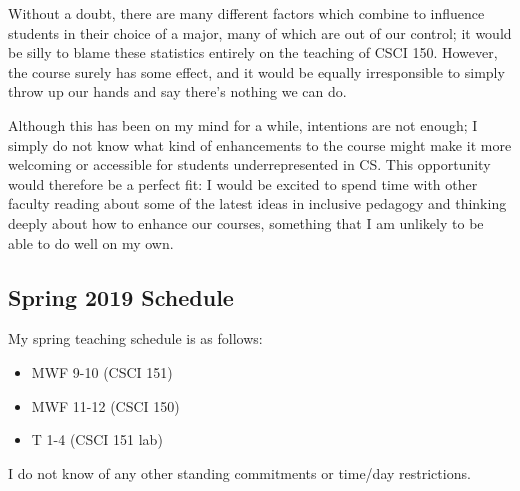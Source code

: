 \documentclass{article}
\begin{document}
Without a doubt, there are many different factors which combine to
influence students in their choice of a major, many of which are out
of our control; it would be silly to blame these statistics entirely
on the teaching of CSCI 150.  However, the course surely has some
effect, and it would be equally irresponsible to simply throw up our
hands and say there's nothing we can do.

Although this has been on my mind for a while, intentions are not
enough; I simply do not know what kind of enhancements to the course
might make it more welcoming or accessible for students
underrepresented in CS.  This opportunity would therefore be a perfect
fit: I would be excited to spend time with other faculty reading about
some of the latest ideas in inclusive pedagogy and thinking deeply
about how to enhance our courses, something that I am unlikely to be
able to do well on my own.


\subsection*{Spring 2019 Schedule}

My spring teaching schedule is as follows:

\begin{itemize}
\item MWF 9-10 (CSCI 151)
\item MWF 11-12 (CSCI 150)
\item T 1-4 (CSCI 151 lab)
\end{itemize}

I do not know of any other standing commitments or time/day restrictions.
\end{document}
